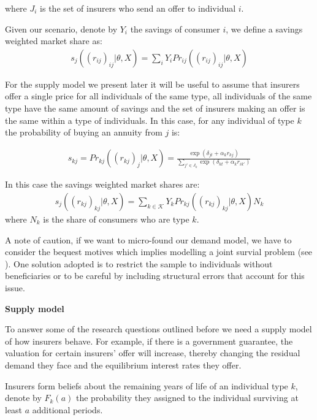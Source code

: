 \documentclass[12pt]{article}
\theoremstyle{plain}
\theoremstyle{plain}
\begin{document}
where $J_i$ is the set of insurers who send an offer to individual $i$. 

Given our scenario, denote by $Y_i$ the savings of consumer $i$, we define a savings weighted market share as: 
\begin{align}
    s_j((r_{ij})_{ij}|\theta, X) = \sum_i Y_i Pr_{ij}((r_{ij})_{ij}|\theta, X)
\end{align}

For the supply model we present later it will be useful to assume that insurers offer a single price for all individuals of the same type, all individuals of the same type have the same amount of savings and the set of insurers making an offer is the same within a type of individuals. In this case, for any individual of type $k$ the probability of buying an annuity from $j$ is: 


\begin{align*}
    s_{kj} = Pr_{kj}((r_{kj})_{j}|\theta, X) = \frac{\exp(\delta_{jt} + \alpha_{k}r_{kj})}{\sum_{j'\in J_k}\exp(\delta_{kt} + \alpha_kr_{ik'})}
\end{align*}



In this case the savings weighted market shares are: 
\begin{align}
    s_j((r_{kj})_{kj}|\theta, X) = \sum_{k  \in \mathcal{K}} Y_k Pr_{kj}((r_{kj})_{kj}|\theta, X)N_k
\end{align}
where $N_k$ is the share of consumers who are type $k$. 

A note of caution, if we want to micro-found our demand model, we have to consider the bequest motives which implies modelling a joint survial problem (see \textcite{illanes_switching_2017}). One solution adopted is to restrict the sample to individuals without beneficiaries or to be careful by including structural errors that account for this issue. 


\textbf{Supply model}

To answer some of the research questions outlined before we need a supply model of how insurers behave. For example, if there is a government guarantee, the valuation for certain insurers' offer will increase, thereby changing the residual demand they face and the equilibrium interest rates they offer. 

Insurers form beliefs about the remaining years of life of an individual type $k$, denote by $F_k(a)$ the probability they assigned to the individual surviving at least $a$ additional periods. 
\end{document}
